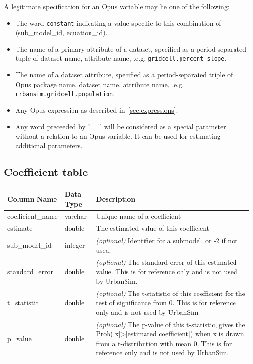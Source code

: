 A legitimate specification for an Opus variable may be one of the following:

\begin{itemize}

\item The word \verb|constant| indicating a value specific to this combination
of (sub_model_id, equation_id).

\item The name of a primary attribute of a dataset, specified as a period-separated
tuple of dataset name, attribute name, .e.g.
\verb|gridcell.percent_slope|.

\item The name of a dataset attribute, specified as a period-separated triple of
Opus package name, dataset name, attribute name, .e.g. \verb|urbansim.gridcell.population|.

\item Any Opus expression as described in~\ref{sec:expressions}.
 
\item Any word preceeded by '__' will be considered as a special parameter without a relation to an Opus variable.
It can be used for estimating additional parameters.
\end{itemize}

\subsection{Coefficient table}

\begin{tabular}{llp{4.5in}}

\textbf{Column Name} & \textbf{Data Type} & \textbf{Description} \\

\hline
coefficient_name & varchar & Unique name of a coefficient  \\

\hline
estimate & double & The estimated value of this coefficient \\

\hline
sub_model_id & integer &  \emph{(optional)} Identifier for a submodel, or
-2 if not used. \\

\hline
standard_error & double & \emph{(optional) }
The standard error of this estimated value. This is for reference only and is
not used by UrbanSim.  \\

\hline
t_statistic & double & \emph{(optional) }
The t-statistic of this coefficient for the test of significance from 0. This
is for reference only and is not used by UrbanSim.  \\

\hline p_value & double & \emph{(optional) } The p-value of this t-statistic,
gives the Prob(|x|\textgreater{}|estimated coefficient|) when x is drawn from a
t-distribution with mean 0. This is for reference only and is not used by
UrbanSim.   \\

\hline

\end{tabular}

